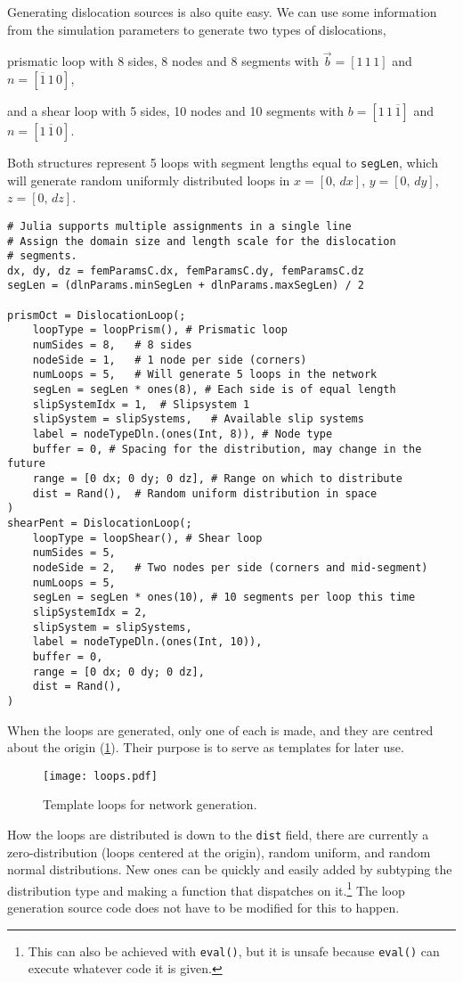Generating dislocation sources is also quite easy. We can use some information from the simulation parameters to generate two types of dislocations,
\begin{inparaenum}
    \item prismatic loop with 8 sides, 8 nodes and 8 segments with $\vec{b} = [1\, 1\, 1]$ and $n = [\overline{1}\, 1\, 0]$,
    \item and a shear loop with 5 sides, 10 nodes and 10 segments with $b = [1\, 1\, \overline{1}]$ and $n = [1\, \overline{1}\, 0]$.
\end{inparaenum}
Both structures represent 5 loops with segment lengths equal to \texttt{segLen}, which will generate random uniformly distributed loops in $x = [0,\, dx]$, $y = [0,\, dy]$, $z = [0,\, dz]$.
\begin{verbatim}
# Julia supports multiple assignments in a single line
# Assign the domain size and length scale for the dislocation
# segments.
dx, dy, dz = femParamsC.dx, femParamsC.dy, femParamsC.dz
segLen = (dlnParams.minSegLen + dlnParams.maxSegLen) / 2

prismOct = DislocationLoop(;
    loopType = loopPrism(), # Prismatic loop
    numSides = 8,   # 8 sides
    nodeSide = 1,   # 1 node per side (corners)
    numLoops = 5,   # Will generate 5 loops in the network
    segLen = segLen * ones(8), # Each side is of equal length
    slipSystemIdx = 1,  # Slipsystem 1
    slipSystem = slipSystems,   # Available slip systems
    label = nodeTypeDln.(ones(Int, 8)), # Node type
    buffer = 0, # Spacing for the distribution, may change in the future
    range = [0 dx; 0 dy; 0 dz], # Range on which to distribute
    dist = Rand(),  # Random uniform distribution in space
)
shearPent = DislocationLoop(;
    loopType = loopShear(), # Shear loop
    numSides = 5,
    nodeSide = 2,   # Two nodes per side (corners and mid-segment)
    numLoops = 5,
    segLen = segLen * ones(10), # 10 segments per loop this time
    slipSystemIdx = 2,
    slipSystem = slipSystems,
    label = nodeTypeDln.(ones(Int, 10)),
    buffer = 0,
    range = [0 dx; 0 dy; 0 dz],
    dist = Rand(),
)
\end{verbatim}
When the loops are generated, only one of each is made, and they are centred about the origin (\cref{f:templateLoops}). Their purpose is to serve as templates for later use.
\begin{figure}
    \centering
    \texttt{[image: loops.pdf]}
    \caption{Template loops for network generation.}
    \label{f:templateLoops}
\end{figure}
How the loops are distributed is down to the \texttt{dist} field, there are currently a zero-distribution (loops centered at the origin), random uniform, and random normal distributions. New ones can be quickly and easily added by subtyping the distribution type and making a function that dispatches on it.\footnote{This can also be achieved with \texttt{eval()}, but it is unsafe because \texttt{eval()} can execute whatever code it is given.} The loop generation source code does not have to be modified for this to happen.

